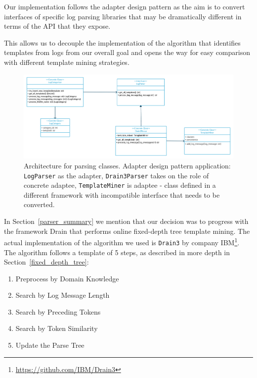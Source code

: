 Our implementation follows the adapter design pattern \cite{gamma1995design_pattern_adapter} as the aim is to convert interfaces of specific log parsing libraries that may be dramatically different in terms of the API that they expose.

This allows us to decouple the implementation of the algorithm that identifies templates from logs from our overall goal and opens the way for easy comparison with different template mining strategies.\\

\begin{figure}[!tbp]
    \includegraphics[width=\textwidth]{img/UML Adapter LogParser.png}		    
    \caption{Architecture for parsing classes. Adapter design pattern application: \texttt{LogParser} as the adapter, \texttt{Drain3Parser} takes on the role of concrete adaptee, \texttt{TemplateMiner} is adaptee - class defined in a different framework with incompatible interface that needs to be converted.}
	\label{fig:uml_parsers}
\end{figure}

In Section~\ref{parser_summary} we mention that our decision was to progress with the framework Drain \cite{drain2017} that performs online fixed-depth tree template mining. The actual implementation of the algorithm we used is \texttt{Drain3} by company IBM\footnote{\url{https://github.com/IBM/Drain3}}. The algorithm follows a template of 5 steps, as described in more depth in Section~\ref{fixed_depth_tree}:
\begin{enumerate}
    \item Preprocess by Domain Knowledge
    \item Search by Log Message Length
    \item Search by Preceding Tokens
    \item Search by Token Similarity
    \item Update the Parse Tree
\end{enumerate}

